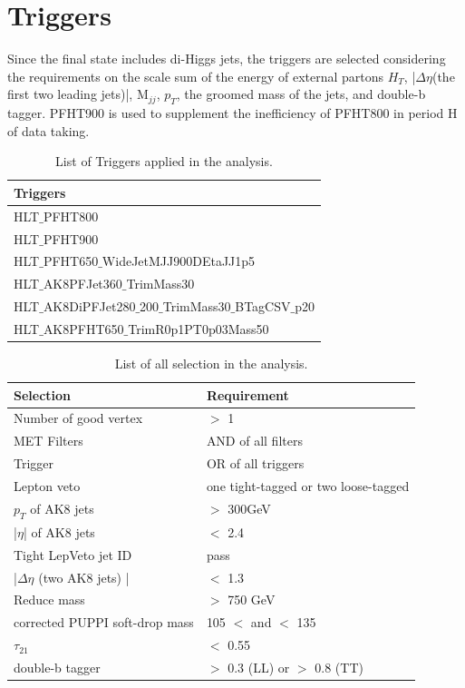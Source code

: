 \section{Triggers} \label{Triggers}
Since the final state includes di-Higgs jets, the triggers are selected considering the requirements on the scale sum of the energy of external partons $H_T$, |$\Delta \eta $(the first two leading jets)|, M$_{jj}$, $p_T$, the groomed mass of the jets, and double-b tagger. PFHT900 is used to supplement the inefficiency of PFHT800 in period H of data taking.
\begin{table}[h!]
  \begin{center}
    \begin{tabular}{l}
    Triggers \\
    \hline
    HLT$\_$PFHT800 \\
    HLT$\_$PFHT900 \\
    HLT$\_$PFHT650$\_$WideJetMJJ900DEtaJJ1p5 \\
    HLT$\_$AK8PFJet360$\_$TrimMass30 \\
    HLT$\_$AK8DiPFJet280$\_$200$\_$TrimMass30$\_$BTagCSV$\_$p20 \\
    HLT$\_$AK8PFHT650$\_$TrimR0p1PT0p03Mass50 \\
    \hline
    \end{tabular}
  \end{center}

  \caption{List of Triggers applied in the analysis.}
\end{table} 

\begin{table}[h!]
  \begin{center}
    \begin{tabular}{ll}
    Selection & Requirement \\
    \hline
    Number of good vertex & $>$ 1 \\
    MET Filters & AND of all filters\\
	Trigger & OR of all triggers\\
	Lepton veto & one tight-tagged or two loose-tagged \\
    $p_{T}$ of AK8 jets & $>$ 300GeV \\
	|$\eta$| of AK8 jets & $<$ 2.4 \\
	Tight LepVeto jet ID & pass \\
	|$\Delta \eta $ (two AK8 jets) | & $<$ 1.3 \\
	Reduce mass & $>$ 750 GeV \\
	corrected PUPPI soft-drop mass & 105 $<$ and $<$ 135 \\
	$\tau _{21}$ & $<$ 0.55 \\
	double-b tagger & $>$ 0.3 (LL) or $>$ 0.8 (TT)\\
	\hline
    \end{tabular}
  \end{center}

  \caption{List of all selection in the analysis.}
\end{table} 

